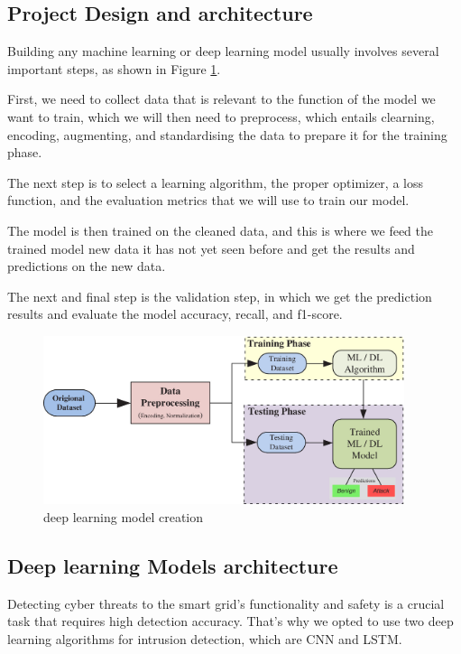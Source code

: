 \subsection{Project Design and architecture}
Building any machine learning or deep learning model usually involves several important steps, as shown in Figure  \ref{fig:DL-creation}.


First, we need to collect data that is relevant to the function of the model we want to train, which we will then need to preprocess, which entails clearning, encoding, augmenting, and standardising the data to prepare it for the training phase.


The next step is to select a learning algorithm, the proper optimizer, a loss function, and the evaluation metrics that we will use to train our model.


The model is then trained on the cleaned data, and this is where we feed the trained model new data it has not yet seen before and get the results and predictions on the new data.


The next and final step is the validation step, in which we get the prediction results and evaluate the model accuracy, recall, and f1-score.

\begin{figure}[h]
	\centering
	\includegraphics[width=400px]{figures/DL_creation.jpg}
	\caption{deep learning model creation}
	\label{fig:DL-creation}
\end{figure}









\subsection{Deep learning Models architecture}
Detecting cyber threats to the smart grid's functionality and safety is a crucial task that requires high detection accuracy. That's why we opted to use two deep learning algorithms for intrusion detection, which are CNN and LSTM.







